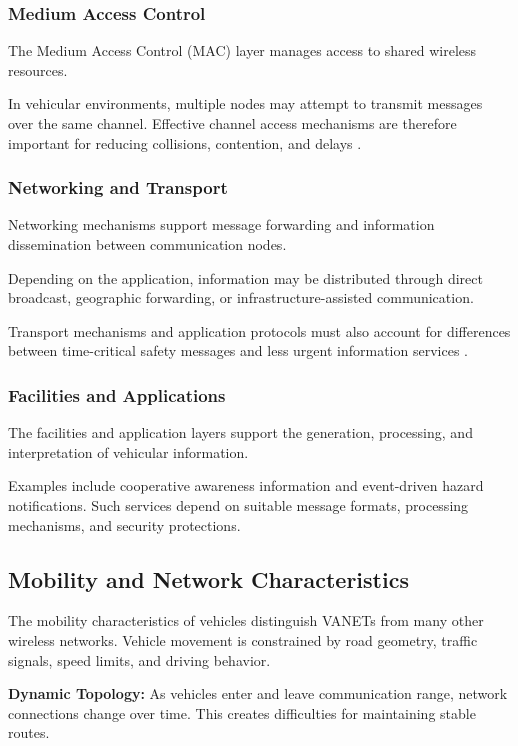 \subsubsection{Medium Access Control}

The Medium Access Control
(MAC) layer manages access
to shared wireless resources.

In vehicular environments,
multiple nodes may attempt
to transmit messages over
the same channel. Effective
channel access mechanisms
are therefore important
for reducing collisions,
contention, and delays
\cite{Zeadally2012}.

\subsubsection{Networking and Transport}

Networking mechanisms support
message forwarding and
information dissemination
between communication nodes.

Depending on the application,
information may be distributed
through direct broadcast,
geographic forwarding,
or infrastructure-assisted
communication.

Transport mechanisms and
application protocols must
also account for differences
between time-critical
safety messages and
less urgent information
services \cite{Karagiannis2011}.

\subsubsection{Facilities and Applications}

The facilities and application
layers support the generation,
processing, and interpretation
of vehicular information.

Examples include cooperative
awareness information and
event-driven hazard
notifications. Such services
depend on suitable message
formats, processing mechanisms,
and security protections.

\subsection{Mobility and Network Characteristics}
\label{sec:2E}

The mobility characteristics
of vehicles distinguish VANETs
from many other wireless networks.
Vehicle movement is constrained
by road geometry, traffic signals,
speed limits, and driving behavior.

\textbf{Dynamic Topology:}
As vehicles enter and leave
communication range, network
connections change over time.
This creates difficulties
for maintaining stable routes.

